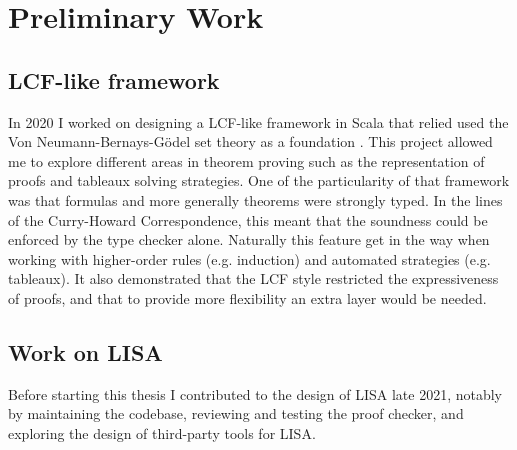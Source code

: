 \section{Preliminary Work}
\label{sec:preliminary-work}

\subsection{LCF-like framework}

In 2020 I worked on designing a LCF-like framework in Scala that relied used the Von Neumann-Bernays-Gödel set theory as a foundation \cite{Cassayre2020}. This project allowed me to explore different areas in theorem proving such as the representation of proofs and tableaux solving strategies. One of the particularity of that framework was that formulas and more generally theorems were strongly typed. In the lines of the Curry-Howard Correspondence, this meant that the soundness could be enforced by the type checker alone. Naturally this feature get in the way when working with higher-order rules (e.g. induction) and automated strategies (e.g. tableaux). It also demonstrated that the LCF style restricted the expressiveness of proofs, and that to provide more flexibility an extra layer would be needed.

\subsection{Work on LISA}

Before starting this thesis I contributed to the design of LISA late 2021, notably by maintaining the codebase, reviewing and testing the proof checker, and exploring the design of third-party tools for LISA.

